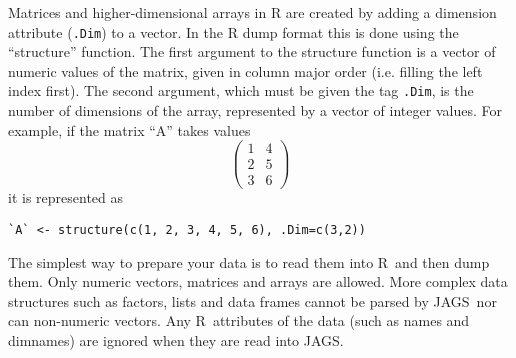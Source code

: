 \documentclass[11pt, a4paper, titlepage]{report}
\newcommand{\JAGS}{\textsf{JAGS}}
\newcommand{\R}{\textsf{R}}
\begin{document}
Matrices and higher-dimensional arrays in R are created by adding a
dimension attribute (\verb+.Dim+) to a vector. In the R dump format
this is done using the ``structure'' function.  The first argument to
the structure function is a vector of numeric values of the matrix,
given in column major order (i.e. filling the left index first). The
second argument, which must be given the tag \verb+.Dim+, is the
number of dimensions of the array, represented by a vector of integer
values. For example, if the matrix ``A'' takes values
\[
\left(
\begin{array}{cc}
  1 & 4 \\
  2 & 5 \\
  3 & 6 
\end{array}
\right)
\]
it is represented as
\begin{verbatim}
`A` <- structure(c(1, 2, 3, 4, 5, 6), .Dim=c(3,2))
\end{verbatim}

The simplest way to prepare your data is to read them into \R\ and
then dump them.  Only numeric vectors, matrices and arrays are
allowed. More complex data structures such as factors, lists and data
frames cannot be parsed by \JAGS\, nor can non-numeric vectors.  Any
\R\ attributes of the data (such as names and dimnames) are ignored
when they are read into \JAGS. 



\end{document}
